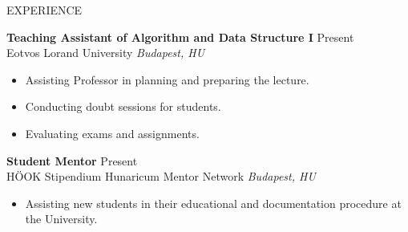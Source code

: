 \documentclass{resume} %
\begin{document}

\begin{rSection}{EXPERIENCE}

\textbf{Teaching Assistant of Algorithm and Data Structure I} \hfill Present\\
Eotvos Lorand University \hfill \textit{Budapest, HU}
 \begin{itemize}
    \itemsep -3pt {} 
     \item Assisting Professor in planning and preparing the lecture.
     \item Conducting doubt sessions for students.
    \item Evaluating exams and assignments. 
 \end{itemize}
 
\textbf{Student Mentor} \hfill Present\\
HÖOK Stipendium Hunaricum Mentor Network \hfill \textit{Budapest, HU}
 \begin{itemize}
    \itemsep -1pt {} 
     \item Assisting new students in their educational and documentation procedure at the University. 
 \end{itemize}

\end{rSection} 

\end{document}
